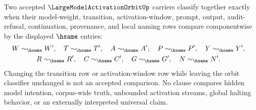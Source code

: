 \begin{definition}
\label{def:largemodel-activation-orbit-classifier}
Two accepted $\LargeModelActivationOrbitUp$ carriers classify together exactly when their model-weight, transition, activation-window, prompt, output, audit-refusal, continuation, provenance, and local naming rows compare componentwise by the displayed $\hsame$ entries:
$$
\begin{gathered}
W\sim_{\hsame}W',\quad T\sim_{\hsame}T',\quad A\sim_{\hsame}A',\quad P\sim_{\hsame}P',\quad Y\sim_{\hsame}Y',\\
R\sim_{\hsame}R',\quad C\sim_{\hsame}C',\quad G\sim_{\hsame}G',\quad N\sim_{\hsame}N'.
\end{gathered}
$$
Changing the transition row or activation-window row while leaving the orbit classifier unchanged is not an accepted comparison. No clause compares hidden model intention, corpus-wide truth, unbounded activation streams, global halting behavior, or an externally interpreted universal claim.
\end{definition}


